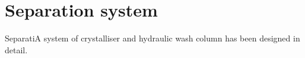 \section*{Separation system}

SeparatiA system of crystalliser and hydraulic wash column has been designed in detail. 